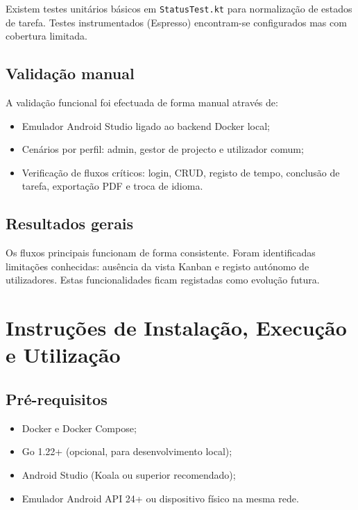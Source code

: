 \documentclass[12pt,a4paper]{article}
\begin{document}
Existem testes unitários básicos em \texttt{StatusTest.kt} para normalização de estados de tarefa. Testes instrumentados (Espresso) encontram-se configurados mas com cobertura limitada. 

\subsection{Validação manual}

A validação funcional foi efectuada de forma manual através de:

\begin{itemize}[leftmargin=*]
    \item Emulador Android Studio ligado ao backend Docker local;
    \item Cenários por perfil: admin, gestor de projecto e utilizador comum;
    \item Verificação de fluxos críticos: login, CRUD, registo de tempo, conclusão de tarefa, exportação PDF e troca de idioma.
\end{itemize}

\subsection{Resultados gerais}

Os fluxos principais funcionam de forma consistente. Foram identificadas limitações conhecidas: ausência da vista Kanban e registo autónomo de utilizadores. Estas funcionalidades ficam registadas como evolução futura.

\section{Instruções de Instalação, Execução e Utilização}

\subsection{Pré-requisitos}

\begin{itemize}[leftmargin=*]
    \item Docker e Docker Compose;
    \item Go 1.22+ (opcional, para desenvolvimento local);
    \item Android Studio (Koala ou superior recomendado);
    \item Emulador Android API 24+ ou dispositivo físico na mesma rede.
\end{itemize}
\end{document}
